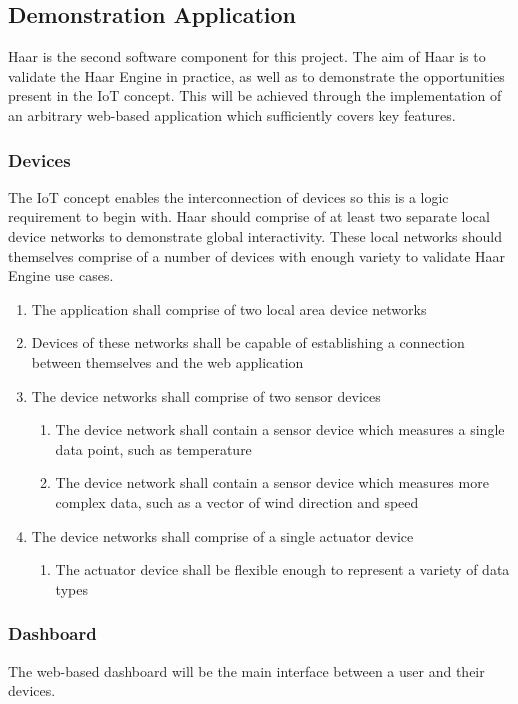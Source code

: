     \subsection{Demonstration Application}
      Haar is the second software component for this project. The aim of Haar is to validate the Haar Engine in practice, as well as to demonstrate the opportunities present in the IoT concept. This will be achieved through the implementation of an arbitrary web-based application which sufficiently covers key features.

      \subsubsection{Devices}
        The IoT concept enables the interconnection of devices so this is a logic requirement to begin with. Haar should comprise of at least two separate local device networks to demonstrate global interactivity. These local networks should themselves comprise of a number of devices with enough variety to validate Haar Engine use cases.

        \begin{enumerate}
          \item The application shall comprise of two local area device networks
          \item Devices of these networks shall be capable of establishing a connection between themselves and the web application
          \item The device networks shall comprise of two sensor devices
          \begin{enumerate}
            \item The device network shall contain a sensor device which measures a single data point, such as temperature
            \item The device network shall contain a sensor device which measures more complex data, such as a vector of wind direction and speed 
          \end{enumerate}
          \item The device networks shall comprise of a single actuator device
          \begin{enumerate}
            \item The actuator device shall be flexible enough to represent a variety of data types
          \end{enumerate} 
        \end{enumerate}

      \subsubsection{Dashboard}
        The web-based dashboard will be the main interface between a user and their devices.

